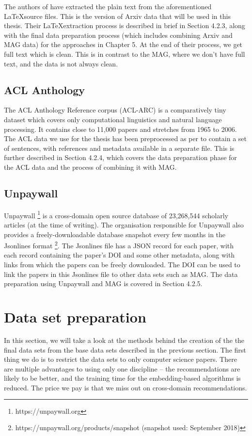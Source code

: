 The authors of \cite{SaierF19} have extracted the plain text from the aforementioned \LaTeX source files. This is the version of Arxiv data that will be used in this thesis. Their \LaTeX extraction process is described in brief in Section 4.2.3, along with the final data preparation process (which includes combining Arxiv and MAG data) for the approaches in Chapter 5. At the end of their process, we get full text which is clean. This is in contrast to the MAG, where we don't have full text, and the data is not always clean. 
\subsection{ACL Anthology}
The ACL Anthology Reference corpus (ACL-ARC) is a comparatively tiny dataset which covers only computational linguistics and natural language processing. It contains close to 11,000 papers and stretches from 1965 to 2006. The ACL data we use for the thesis has been preprocessed as per \cite{Faerber2018} to contain a set of sentences, with references and metadata available in a separate file. This is further described in Section 4.2.4, which covers the data preparation phase for the ACL data and the process of combining it with MAG.
\subsection{Unpaywall}
Unpaywall \footnote{https://unpaywall.org} is a cross-domain open source database of 23,268,544 scholarly articles (at the time of writing). The organisation responsible for Unpaywall also provides a freely-downloadable database snapshot every few months in the Jsonlines format \footnote{https://unpaywall.org/products/snapshot (snapshot used: September 2018)}. 
The Jsonlines file has a JSON record for each paper, with each record containing the paper's DOI and some other metadata, along with links from which the papers can be freely downloaded. The DOI can be used to link the papers in this Jsonlines file to other data sets such as MAG. The data preparation using Unpaywall and MAG is covered in Section 4.2.5. 
\section{Data set preparation}\label{sec:data-set-creation}
In this section, we will take a look at the methods behind the creation of the the final data sets from the base data sets described in the previous section. The first thing we do is to restrict the data sets to only computer science papers. There are multiple advantages to using only one discipline -- the recommendations are likely to be better, and the training time for the embedding-based algorithms is reduced. The price we pay is that we miss out on cross-domain recommendations. 

